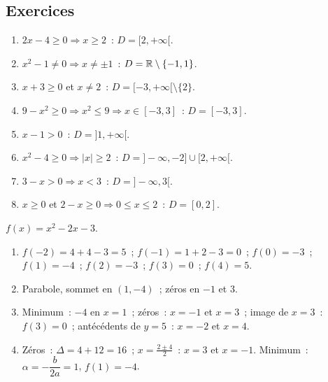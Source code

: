 
\subsection*{Exercices}


\begin{enumerate}
  \item $2x-4\geq0\Rightarrow x\geq2$~: $D=[2,+\infty[$.
  \item $x^2-1\ne0\Rightarrow x\ne\pm1$~: $D=\mathbb{R}\setminus\{-1,1\}$.
  \item $x+3\geq0$ et $x\ne2$~: $D=[-3,+\infty[\setminus\{2\}$.
  \item $9-x^2\geq0\Rightarrow x^2\leq9\Rightarrow x\in[-3,3]$~: $D=[-3,3]$.
  \item $x-1>0$~: $D=]1,+\infty[$.
  \item $x^2-4\geq0\Rightarrow|x|\geq2$~: $D=]-\infty,-2]\cup[2,+\infty[$.
  \item $3-x>0\Rightarrow x<3$~: $D=]-\infty,3[$.
  \item $x\geq0$ et $2-x\geq0\Rightarrow0\leq x\leq2$~: $D=[0,2]$.
\end{enumerate}


$f(x)=x^2-2x-3$.
\begin{enumerate}
  \item $f(-2)=4+4-3=5$~; $f(-1)=1+2-3=0$~; $f(0)=-3$~; $f(1)=-4$~; $f(2)=-3$~;
        $f(3)=0$~; $f(4)=5$.
  \item Parabole, sommet en $(1,-4)$~; z\'eros en $-1$ et $3$.
  \item Minimum~: $-4$ en $x=1$~; z\'eros~: $x=-1$ et $x=3$~;
        image de $x=3$~: $f(3)=0$~; ant\'ec\'edents de $y=5$~: $x=-2$ et $x=4$.
  \item Z\'eros~: $\Delta=4+12=16$~; $x=\frac{2\pm4}{2}$~: $x=3$ et $x=-1$.\checkmark
        Minimum~: $\alpha=-\dfrac{b}{2a}=1$, $f(1)=-4$.\checkmark
\end{enumerate}


